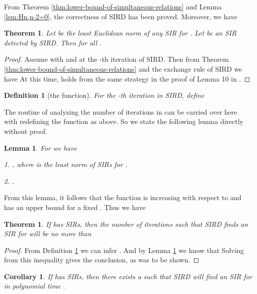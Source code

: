 \documentclass{sig-alternate}
\newtheorem{lem}[theorem]{Lemma}
\newtheorem{thm}[theorem]{Theorem}
\newtheorem{cor}[theorem]{Corollary}
\newtheorem{defn}[theorem]{Definition}
\numberwithin{theorem}{section} \numberwithin{equation}{section}
\begin{document}
From Theorem \ref{thm:lower-bound-of-simultaneous-relations} and
Lemma \ref{lem:Hn,n-2=0}, the correctness of SIRD has been proved.
Moreover, we have

\begin{thm}\label{thm:upper-bound-for-SIRs}
Let  be the least Euclidean norm of any SIR for . Let
  be an SIR detected by SIRD. Then
 for all
.
\end{thm}
\begin{proof}
Assume  with  and 
at the -th iteration of SIRD. Then from Theorem
\ref{thm:lower-bound-of-simultaneous-relations} and the exchange
rule of SIRD we have
 At this time,  holds from
the same strategy in the proof of Lemma 10 in \cite{FBA1999}.
\end{proof}
\begin{defn}[the  function]\label{def:Pi-function}
For the -th iteration in SIRD, define

\end{defn}

The routine of analyzing the number of iterations in \cite{FBA1999}
can be carried over here with redefining the  function as
above. So we state the following lemma directly without proof.

\begin{lem}\label{lem:Pi-function}
For  we have


1. , where  is the least norm of
SIRs for .


2. .
\end{lem}





From this lemma, it follows that the  function is increasing
with respect to  and has an upper bound for a fixed
. Thus we have

\begin{thm}\label{thm:the-number-of-iterations}
If  has SIRs, then the number of
iterations such that SIRD finds an SIR for  will be no more than

\end{thm}

\begin{proof}
From Definition \ref{def:Pi-function} we can infer .
And by Lemma \ref{lem:Pi-function} we know that  Solving 
from this inequality gives the conclusion, as was to be shown.
\end{proof}


\begin{cor}\label{thm:time-complexity-of-simultaneous-relation}
If  has SIRs, then there exists a
 such that SIRD will find an SIR for  in polynomial time
.
\end{cor}
\end{document}
